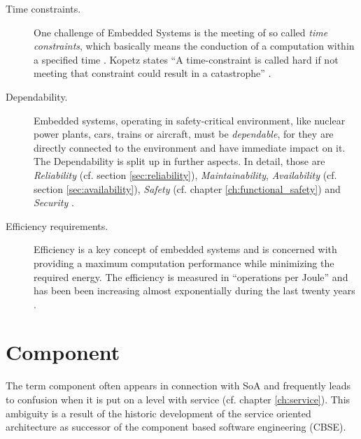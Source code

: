 \begin{description}
	\item [Time constraints.]
	One challenge of Embedded Systems is the meeting of so called \emph{time constraints}, which basically means the conduction of a computation within a specified time \cite[p.8-9]{marwedel} \cite{rodrigues2011}. Kopetz states ``A time-constraint is called hard if not meeting that constraint could result in a catastrophe'' \cite{kopetz}.
	\item [Dependability.]
	Embedded systems, operating in safety-critical environment, like nuclear power plants, cars, trains or aircraft, must be \emph{dependable}, for they are directly connected to the environment and have immediate impact on it. The Dependability is split up in further aspects. In detail, those are \emph{Reliability} (cf. section \ref{sec:reliability}), \emph{Maintainability}, \emph{Availability} (cf. section \ref{sec:availability}), \emph{Safety} (cf. chapter \ref{ch:functional_safety}) and \emph{Security} \cite[p.4-5]{marwedel}.
	\item [Efficiency requirements.]
	Efficiency is a key concept of embedded systems and is concerned with providing a maximum computation performance while minimizing the required energy. The efficiency is measured in ``operations per Joule'' and has been been increasing almost exponentially during the last twenty years \cite{marwedel}.
\end{description}






\section{Component}
\label{ch:component}

The term component often appears in connection with SoA and frequently leads to confusion when it is put on a level with service (cf. chapter \ref{ch:service}). This ambiguity is a result of the historic development of the service oriented architecture as successor of the component based software engineering (CBSE).

